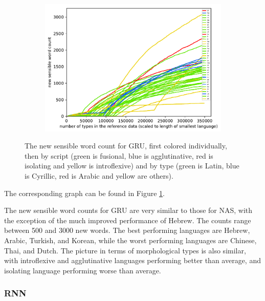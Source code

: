 \documentclass[11pt,a4paper,twoside,openright]{scrbook}
\begin{document}
\begin{figure}[h]
\begin{subfigure}[b]{0.32\textwidth}
    	\centering
        \includegraphics[width=\textwidth]{graphs/gru/scripts/norm_huge_type_type_performance}
    \end{subfigure}
    \caption{The new sensible word count for GRU, first colored individually, then by script (green is fusional, blue is agglutinative, red is isolating and yellow is introflexive) and by type (green is Latin, blue is Cyrillic, red is Arabic and yellow are others).}
	\label{Figure:gru_norm_huge_type_type_performance}
\end{figure}

The corresponding graph can be found in Figure \ref{Figure:gru_norm_huge_type_type_performance}.

The new sensible word counts for GRU are very similar to those for NAS, with the exception of the much improved performance of Hebrew. The counts range between 500 and 3000 new words. The best performing languages are Hebrew, Arabic, Turkish, and Korean, while the worst performing languages are Chinese, Thai, and Dutch. The picture in terms of morphological types is also similar, with introflexive and agglutinative languages performing better than average, and isolating language performing worse than average.

\subsubsection{RNN}
\end{document}
